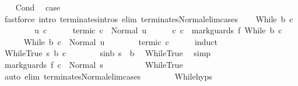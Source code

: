 \begin{isabellebody}
\isamarkupfalse%
\isanewline
\ \ \isamarkupfalse%
\ Cond\ \isamarkupfalse%
\ {\isacharquery}case\ \isanewline
\ \ \ \ \isamarkupfalse%
\ {\isacharparenleft}fastforce\ intro{\isacharcolon}\ terminates{\isachardot}intros\ elim{\isacharcolon}\ terminates{\isacharunderscore}Normal{\isacharunderscore}elim{\isacharunderscore}cases{\isacharparenright}\isanewline
{}\isamarkupfalse%
\isanewline
\ \ \isamarkupfalse%
\ {\isacharparenleft}While\ b\ c{\isacharparenright}\isanewline
\ \ \isacommand{{\isacharbraceleft}}\isamarkupfalse%
\isanewline
\ \ \ \ \isamarkupfalse%
\ u\ c{\isacharprime}\isanewline
\ \ \ \ \isamarkupfalse%
\ termi{\isacharunderscore}c{\isacharprime}{\isacharcolon}\ {\isachardoublequoteopen}{\isasymGamma}{\isasymturnstile}c{\isacharprime}\ {\isasymdown}\ Normal\ u{\isachardoublequoteclose}\isanewline
\ \ \ \ \isamarkupfalse%
\ c{\isacharprime}{\isacharcolon}\ {\isachardoublequoteopen}c{\isacharprime}\ {\isacharequal}\ mark{\isacharunderscore}guards\ f\ {\isacharparenleft}While\ b\ c{\isacharparenright}{\isachardoublequoteclose}\isanewline
\ \ \ \ \isamarkupfalse%
\ {\isachardoublequoteopen}{\isasymGamma}{\isasymturnstile}While\ b\ c\ {\isasymdown}\ Normal\ u{\isachardoublequoteclose}\isanewline
\ \ \ \ \ \ \isamarkupfalse%
\ termi{\isacharunderscore}c{\isacharprime}\ c{\isacharprime}\isanewline
\ \ \ \ \isamarkupfalse%
\ {\isacharparenleft}induct{\isacharparenright}\isanewline
\ \ \ \ \ \ \isamarkupfalse%
\ {\isacharparenleft}WhileTrue\ s\ b{\isacharprime}\ c{\isacharprime}{\isacharparenright}\isanewline
\ \ \ \ \ \ \isamarkupfalse%
\ s{\isacharunderscore}in{\isacharunderscore}b{\isacharcolon}\ {\isachardoublequoteopen}s\ {\isasymin}\ b{\isachardoublequoteclose}\ \isamarkupfalse%
\ WhileTrue\ \isamarkupfalse%
\ simp\isanewline
\ \ \ \ \ \ \isamarkupfalse%
\ {\isachardoublequoteopen}{\isasymGamma}{\isasymturnstile}mark{\isacharunderscore}guards\ f\ c\ {\isasymdown}\ Normal\ s{\isachardoublequoteclose}\isanewline
\ \ \ \ \ \ \ \ \isamarkupfalse%
\ WhileTrue\ \isamarkupfalse%
\ {\isacharparenleft}auto\ elim{\isacharcolon}\ terminates{\isacharunderscore}Normal{\isacharunderscore}elim{\isacharunderscore}cases{\isacharparenright}\isanewline
\ \ \ \ \ \ \isamarkupfalse%
\ While{\isachardot}hyps\ \isamarkupfalse%

\end{isabellebody}
